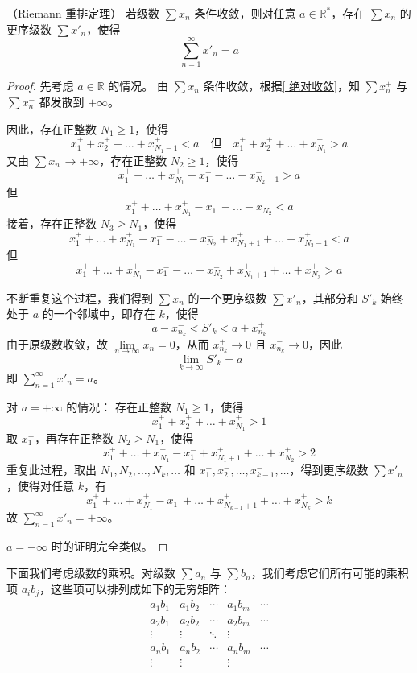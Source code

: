 \begin{theorem}
	（Riemann 重排定理）
	若级数 $\sum x_n$ 条件收敛，则对任意 $a \in \mathbb{R}^*$，存在 $\sum x_n$ 的更序级数 $\sum x'_n$，使得
	\[
	\sum_{n=1}^{\infty} x'_n = a
	\]
\end{theorem}
\begin{proof}
	先考虑 $a \in \mathbb{R}$ 的情况。
	由 $\sum x_n$ 条件收敛，根据\ref{ 绝对收敛}，知 $\sum x_n^+$ 与 $\sum x_n^-$ 都发散到 $+\infty$。
	
	因此，存在正整数 $N_1 \ge 1$，使得
	\[
	x_1^+ + x_2^+ + \dots + x_{N_1-1}^+ < a \quad \text{但} \quad x_1^+ + x_2^+ + \dots + x_{N_1}^+ > a
	\]
	又由 $\sum x_n^- \to +\infty$，存在正整数 $N_2 \ge 1$，使得
	\[
	x_1^+ + \dots + x_{N_1}^+ - x_1^- - \dots - x_{N_2-1}^- > a
	\]
	但
	\[
	x_1^+ + \dots + x_{N_1}^+ - x_1^- - \dots - x_{N_2}^- < a
	\]
	接着，存在正整数 $N_3 \ge N_1$，使得
	\[
	x_1^+ + \dots + x_{N_1}^+ - x_1^- - \dots - x_{N_2}^- + x_{N_1+1}^+ + \dots + x_{N_3-1}^+ < a
	\]
	但
	\[
	x_1^+ + \dots + x_{N_1}^+ - x_1^- - \dots - x_{N_2}^- + x_{N_1+1}^+ + \dots + x_{N_3}^+ > a
	\]
	
	不断重复这个过程，我们得到 $\sum x_n$ 的一个更序级数 $\sum x'_n$，其部分和 $S'_k$ 始终处于 $a$ 的一个邻域中，即存在 $k$，使得
	\[
	a - x_{n_k}^- < S'_k < a + x_{n_k}^+
	\]
	由于原级数收敛，故 $\lim\limits_{n \to \infty} x_n = 0$，从而 $x_{n_k}^+ \to 0$ 且 $x_{n_k}^- \to 0$，因此
	\[
	\lim_{k \to \infty} S'_k = a
	\]
	即 $\sum\limits_{n=1}^{\infty} x'_n = a$。
	
	对 $a = +\infty$ 的情况：
	存在正整数 $N_1 \ge 1$，使得
	\[
	x_1^+ + x_2^+ + \dots + x_{N_1}^+ > 1
	\]
	取 $x_1^-$，再存在正整数 $N_2 \ge N_1$，使得
	\[
	x_1^+ + \dots + x_{N_1}^+ - x_1^- + x_{N_1+1}^+ + \dots + x_{N_2}^+ > 2
	\]
	重复此过程，取出 $N_1, N_2, \dots, N_k, \dots$ 和 $x_1^-, x_2^-, \dots, x_{k-1}^-, \dots$，得到更序级数 $\sum x'_n$，使得对任意 $k$，有
	\[
	x_1^+ + \dots + x_{N_1}^+ - x_1^- + \dots + x_{N_{k-1}+1}^+ + \dots + x_{N_k}^+ > k
	\]
	故 $\sum\limits_{n=1}^{\infty} x'_n = +\infty$。
	
	$a = -\infty$ 时的证明完全类似。
	
\end{proof}



下面我们考虑级数的乘积。对级数 $\sum a_n$ 与 $\sum b_n$，我们考虑它们所有可能的乘积项 $a_i b_j$，这些项可以排列成如下的无穷矩阵：
\[
\begin{array}{ccccc}
	a_1 b_1 & a_1 b_2 & \cdots & a_1 b_m & \cdots \\
	a_2 b_1 & a_2 b_2 & \cdots & a_2 b_m & \cdots \\
	\vdots & \vdots & \ddots & \vdots & \\
	a_n b_1 & a_n b_2 & \cdots & a_n b_m & \cdots \\
	\vdots & \vdots & & \vdots &
\end{array}
\]

